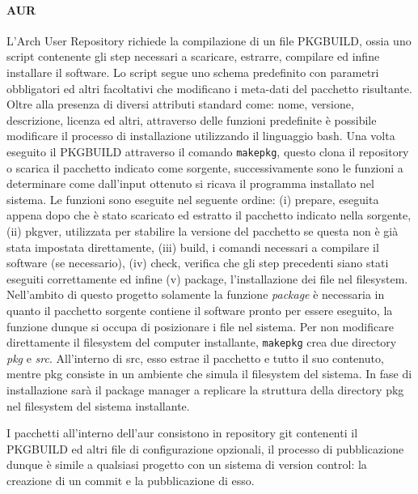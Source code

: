 \paragraph{AUR} L'Arch User Repository richiede la compilazione di un file PKGBUILD, ossia uno script contenente gli step necessari a scaricare, estrarre, compilare ed infine installare il software. Lo script segue uno schema predefinito con parametri obbligatori ed altri facoltativi che modificano i meta-dati del pacchetto risultante. Oltre alla presenza di diversi attributi standard come: nome, versione, descrizione, licenza ed altri, attraverso delle funzioni predefinite è possibile modificare il processo di installazione utilizzando il linguaggio bash. Una volta eseguito il PKGBUILD attraverso il comando \texttt{makepkg}, questo clona il repository o scarica il pacchetto indicato come sorgente, successivamente sono le funzioni a determinare come dall'input ottenuto si ricava il programma installato nel sistema.
Le funzioni sono eseguite nel seguente ordine: (i) prepare, eseguita appena dopo che è stato scaricato ed estratto il pacchetto indicato nella sorgente, (ii) pkgver, utilizzata per stabilire la versione del pacchetto se questa non è già stata impostata direttamente, (iii) build, i comandi necessari a compilare il software (se necessario), (iv) check, verifica che gli step precedenti siano stati eseguiti correttamente ed infine (v) package, l'installazione dei file nel filesystem. Nell'ambito di questo progetto solamente la funzione \textit{package} è necessaria in quanto il pacchetto sorgente contiene il software pronto per essere eseguito, la funzione dunque si occupa di posizionare i file nel sistema.
Per non modificare direttamente il filesystem del computer installante, \texttt{makepkg} crea due directory \textit{pkg} e \textit{src}. All'interno di src, esso estrae il pacchetto e tutto il suo contenuto, mentre pkg consiste in un ambiente che simula il filesystem del sistema. In fase di installazione sarà il package manager a replicare la struttura della directory pkg nel filesystem del sistema installante.

I pacchetti all'interno dell'\ac{aur} consistono in repository git contenenti il PKGBUILD ed altri file di configurazione opzionali, il processo di pubblicazione dunque è simile a qualsiasi progetto con un sistema di version control: la creazione di un commit e la pubblicazione di esso.

